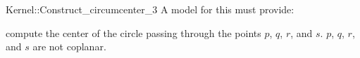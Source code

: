 \begin{ccRefFunctionObjectConcept}{Kernel::Construct_circumcenter_3}
A model for this must provide:


 {compute the center of the circle passing through the points $p$, $q$, $r$, and $s$.
  \ccPrecond $p$, $q$, $r$, and $s$ are not coplanar.}

\end{ccRefFunctionObjectConcept}
